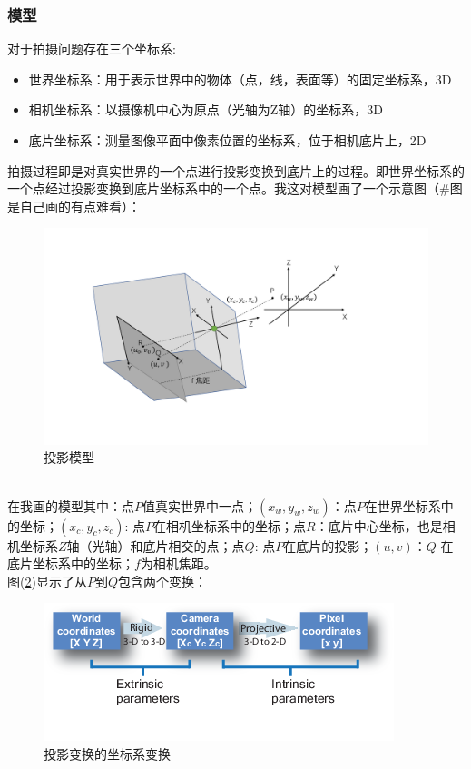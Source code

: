 \documentclass[UTF8]{ctexart}
\begin{document}
\subsubsection{模型}
对于拍摄问题存在三个坐标系\cite{CameraModels18830}:
\begin{itemize}
  \item 世界坐标系：用于表示世界中的物体（点，线，表面等）的固定坐标系，3D
  \item 相机坐标系：以摄像机中心为原点（光轴为Z轴）的坐标系，3D
  \item 底片坐标系：测量图像平面中像素位置的坐标系，位于相机底片上，2D
\end{itemize}
拍摄过程即是对真实世界的一个点进行投影变换到底片上的过程。即世界坐标系的一个点经过投影变换到底片坐标系中的一个点。我这对模型画了一个示意图（\#图是自己画的有点难看）：
\begin{figure}[htp]%
	\centering  %
	\includegraphics[width=0.5\linewidth]{./figures/model.pdf} %
	\caption{投影模型}  %
	\label{fig:model}   %
\end{figure}\\
在我画的模型其中：点$P$值真实世界中一点；$(x_w,y_w,z_w)$：点$P$在世界坐标系中的坐标；$(x_c,y_c,z_c)$: 点$P$在相机坐标系中的坐标；点$R$：底片中心坐标，也是相机坐标系$Z$轴（光轴）和底片相交的点；点$Q$: 点$P$在底片的投影；$(u,v)$：$Q$ 在底片坐标系中的坐标；$f$为相机焦距。\\
图(\ref{fig:calibration_coordinate_blocks})显示了从$P$到$Q$包含两个变换：
\begin{figure}[htpd]%
	\centering  %
	\includegraphics[width=0.5\linewidth]{./figures/calibration_coordinate_blocks.png} %
	\caption{投影变换的坐标系变换\cite{MathWorks18830}}  %
	\label{fig:calibration_coordinate_blocks}   %
\end{figure}\\
\end{document}
